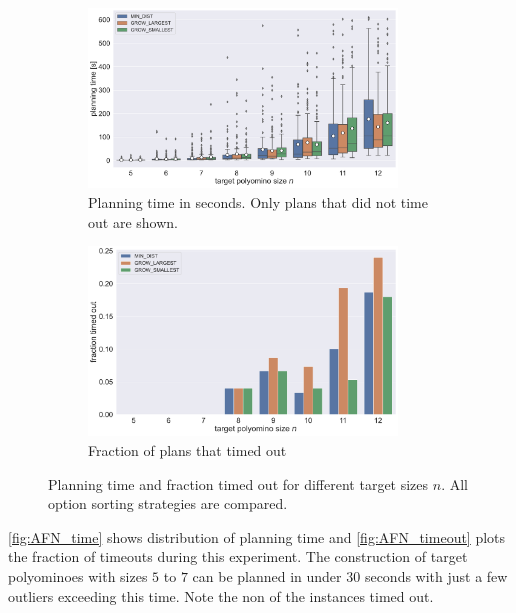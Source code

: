 \begin{figure}
	\centering
	\begin{subfigure}[b]{\textwidth}
		\centering
		\includegraphics[width=0.9\textwidth]{figures/plots/AFN_time.pdf}
		\caption{Planning time in seconds. Only plans that did not time out are shown.}
		\label{fig:AFN_time}
	\end{subfigure}

	\begin{subfigure}[b]{\textwidth}
		\centering
		\includegraphics[width=0.9\textwidth]{figures/plots/AFN_timeout.pdf}
		\caption{Fraction of plans that timed out}
		\label{fig:AFN_timeout}
	\end{subfigure}
	\caption[Planning time and fraction timed out for different target sizes]{Planning time and fraction timed out for different target sizes $n$. All option sorting strategies are compared.}
	\label{fig:AFN_timestats}
\end{figure}

\autoref{fig:AFN_time} shows distribution of planning time and \autoref{fig:AFN_timeout} plots the fraction of timeouts during this experiment.
The construction of target polyominoes with sizes $5$ to $7$ can be planned in under $30$ seconds with just a few outliers exceeding this time.
Note the non of the instances timed out.

